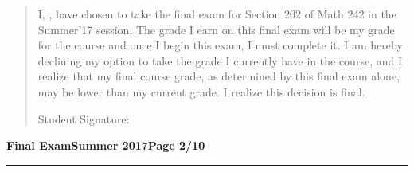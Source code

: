 \documentclass[12pt]{article}
\theoremstyle{definition}
\begin{document}
\bigskip

\begin{quotation}
\noindent I, \makebox[8cm]{\hrulefill}, have chosen to take the final exam for Section 202 of Math 242 in the Summer'17 session.  The grade I earn on this final exam will be my grade for the course and once I begin this exam, I must complete it.  I am hereby declining my option to take the grade I currently have in the course, and I realize that my final course grade, as determined by this final exam alone, may be lower than my current grade.  I realize this decision is final.

\medskip

Student Signature: \makebox[8cm]{\hrulefill}


\end{quotation}
\newpage

\hfill{\large\bf Final Exam}\hfill{\large\bf Summer 2017}\hfill{\large\bf Page 2/10}\hrule
\end{document}
